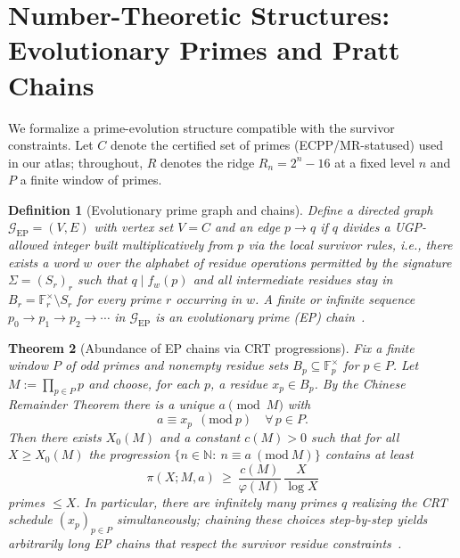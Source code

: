 \documentclass[12pt]{article}
\newtheorem{theorem}{Theorem}[section]
\newtheorem{definition}[theorem]{Definition}
\numberwithin{equation}{section}
\newcommand{\N}{\mathbb{N}}
\begin{document}
\section{Number-Theoretic Structures: Evolutionary Primes and Pratt Chains}\label{sec:evol-primes}
We formalize a prime-evolution structure compatible with the survivor constraints. Let $C$ denote the certified set of primes (ECPP/MR-statused) used in our atlas; throughout, $R$ denotes the ridge $R_n=2^n-16$ at a fixed level $n$ and $P$ a finite window of primes.

\begin{definition}[Evolutionary prime graph and chains]\label{def:EP}
Define a directed graph $\mathcal{G}_{\!\mathrm{EP}}=(V,E)$ with vertex set $V=C$ and an edge $p\to q$ if $q$ divides a \emph{UGP-allowed} integer built multiplicatively from $p$ via the local survivor rules, i.e., there exists a word $w$ over the alphabet of residue operations permitted by the signature $\Sigma=(S_r)_r$ such that $q\mid f_w(p)$ and all intermediate residues stay in $B_r=\mathbb{F}_r^{\times}\setminus S_r$ for every prime $r$ occurring in $w$. A finite or infinite sequence $p_0\to p_1\to p_2\to\cdots$ in $\mathcal{G}_{\!\mathrm{EP}}$ is an \emph{evolutionary prime (EP) chain}~\cite{SpivackUGPFormalization,ugp-lean}.
\end{definition}

\begin{theorem}[Abundance of EP chains via CRT progressions]\label{thm:EP-infinite-full}
Fix a finite window $P$ of odd primes and nonempty residue sets $B_p\subseteq\mathbb{F}_p^\times$ for $p\in P$. Let $M:=\prod_{p\in P}p$ and choose, for each $p$, a residue $x_p\in B_p$. By the Chinese Remainder Theorem there is a unique $a\pmod{M}$ with
\[
a\equiv x_p\ \ (\mathrm{mod}\ p)\quad \forall\,p\in P.
\]
Then there exists $X_0(M)$ and a constant $c(M)>0$ such that for all $X\ge X_0(M)$ the progression $\{n\in\N:\ n\equiv a\ (\mathrm{mod}\ M)\}$ contains at least
\[
\pi(X;M,a)\ \ge\ \frac{c(M)}{\varphi(M)}\,\frac{X}{\log X}
\]
primes $\le X$. In particular, there are infinitely many primes $q$ realizing the CRT schedule $(x_p)_{p\in P}$ simultaneously; chaining these choices step-by-step yields arbitrarily long EP chains that respect the survivor residue constraints~\cite{SpivackUGPFormalization,ugp-lean}.
\end{theorem}
\end{document}
